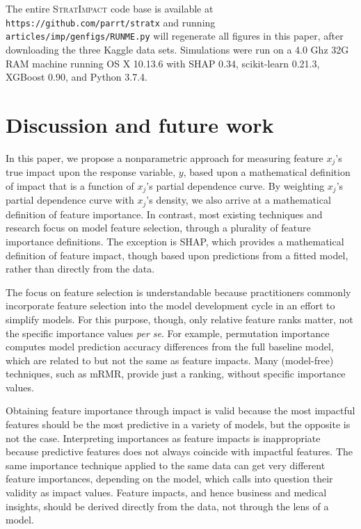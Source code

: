 \documentclass[11pt]{article}
\newcommand{\simp}{\fontfamily{cmr}\textsc{\small StratImpact}}
\begin{document}
The entire \simp{} code base is available at {\tt\small https://github.com/parrt/stratx} and running {\tt\small articles/imp/genfigs/RUNME.py} will regenerate all figures in this paper, after downloading the three Kaggle data sets.  Simulations were run on a 4.0 Ghz 32G RAM machine running OS X 10.13.6 with SHAP 0.34, scikit-learn                       0.21.3, XGBoost 0.90, and Python 3.7.4.

\section{Discussion and future work}\label{sec:discussion}

In this paper, we propose a nonparametric approach for measuring feature $x_j$'s true impact upon the response variable, $y$, based upon a mathematical definition of impact that is a function of $x_j$'s partial dependence curve. By weighting $x_j$'s partial dependence curve with $x_j$'s density, we also arrive at a mathematical definition of feature importance.   In contrast, most existing techniques and research focus on model feature selection, through a plurality of feature importance definitions.   The exception is SHAP, which provides a mathematical definition of feature impact, though based upon predictions from a fitted model, rather than directly from the data.

The focus on feature selection is understandable because practitioners commonly incorporate feature selection into the model development cycle in an effort to simplify models. For this purpose, though, only relative feature ranks matter, not the specific importance values {\em per se}.  For example, permutation importance  computes model prediction accuracy differences from the full baseline model, which are related to but not the same as feature impacts. Many (model-free) techniques, such as mRMR, provide just a ranking, without specific importance values.

Obtaining feature importance through impact is valid because the most impactful features should be the most predictive in a variety of models, but the opposite is not the case.   Interpreting importances as feature impacts is inappropriate because predictive features does not always coincide with impactful features.  The same importance technique applied to the same data can get very different feature importances, depending on the model, which calls into question their validity as impact values.  Feature impacts, and hence business and medical insights, should be derived directly from the data, not through the lens of a model.
\end{document}

